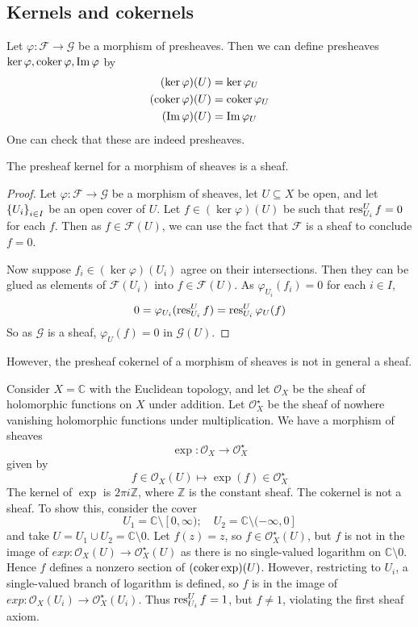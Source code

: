 \subsection{Kernels and cokernels}
Let \( \varphi : \mathcal F \to \mathcal G \) be a morphism of presheaves.
Then we can define presheaves \( \ker \varphi, \operatorname{coker} \varphi, \operatorname{Im} \varphi \) by
\begin{align*}
    (\ker \varphi)(U) &= \ker \varphi_U \\
    (\operatorname{coker} \varphi)(U) &= \operatorname{coker} \varphi_U \\
    (\operatorname{Im} \varphi)(U) &= \operatorname{Im} \varphi_U
\end{align*}
One can check that these are indeed presheaves.
\begin{proposition}
    The presheaf kernel for a morphism of sheaves is a sheaf.
\end{proposition}
\begin{proof}
    Let \( \varphi : \mathcal F \to \mathcal G \) be a morphism of sheaves, let \( U \subseteq X \) be open, and let \( \qty{U_i}_{i \in I} \) be an open cover of \( U \).
    Let \( f \in (\ker \varphi)(U) \) be such that \( \operatorname{res}^U_{U_i} f = 0 \) for each \( f \).
    Then as \( f \in \mathcal F(U) \), we can use the fact that \( \mathcal F \) is a sheaf to conclude \( f = 0 \).

    Now suppose \( f_i \in (\ker \varphi)(U_i) \) agree on their intersections.
    Then they can be glued as elements of \( \mathcal F(U_i) \) into \( f \in \mathcal F(U) \).
    As \( \varphi_{U_i}(f_i) = 0 \) for each \( i \in I \),
    \[ 0 = \varphi_{U_i}(\operatorname{res}_{U_i}^U f) = \operatorname{res}_{U_i}^U \varphi_U(f) \]
    So as \( \mathcal G \) is a sheaf, \( \varphi_U(f) = 0 \) in \( \mathcal G(U) \).
\end{proof}
However, the presheaf cokernel of a morphism of sheaves is not in general a sheaf.
\begin{example}
    Consider \( X = \mathbb C \) with the Euclidean topology, and let \( \mathcal O_X \) be the sheaf of holomorphic functions on \( X \) under addition.
    Let \( \mathcal O_X^\star \) be the sheaf of nowhere vanishing holomorphic functions under multiplication.
    We have a morphism of sheaves
    \[ \exp : \mathcal O_X \to \mathcal O_X^\star \]
    given by
    \[ f \in \mathcal O_X(U) \mapsto \exp(f) \in \mathcal O_X^\star \]
    The kernel of \( \exp \) is \( 2\pi i \mathbb Z \), where \( \mathbb Z \) is the constant sheaf.
    The cokernel is not a sheaf.
    To show this, consider the cover
    \[ U_1 = \mathbb C \setminus [0, \infty);\quad U_2 = \mathbb C \setminus (-\infty, 0] \]
    and take \( U = U_1 \cup U_2 = \mathbb C \setminus \qty{0} \).
    Let \( f(z) = z \), so \( f \in \mathcal O_X^\star(U) \), but \( f \) is not in the image of \( exp : \mathcal O_X(U) \to \mathcal O_X^\star(U) \) as there is no single-valued logarithm on \( \mathbb C \setminus \qty{0} \).
    Hence \( f \) defines a nonzero section of \( (\operatorname{coker} \exp)(U) \).
    However, restricting to \( U_i \), a single-valued branch of logarithm is defined, so \( f \) is in the image of \( exp : \mathcal O_X(U_i) \to \mathcal O_X^\star(U_i) \).
    Thus \( \operatorname{res}_{U_i}^U f = 1 \), but \( f \neq 1 \), violating the first sheaf axiom.
\end{example}
